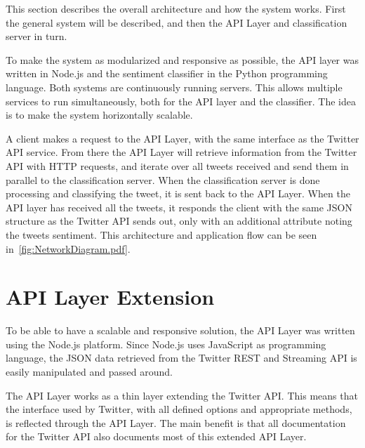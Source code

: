 This section describes the overall architecture and how the system works. First the general system will be described, and then the API Layer and classification server in turn.  

To make the system as modularized and responsive as possible, the API layer was written in Node.js and the sentiment classifier in the Python programming language. Both systems are continuously running servers. This allows multiple services to run simultaneously, both for the API layer and the classifier. The idea is to make the system horizontally scalable.


A client makes a request to the API Layer, with the same interface as the Twitter API service. From there the API Layer will retrieve information from the Twitter API with HTTP requests, and iterate over all tweets received and send them in parallel to the classification server. When the classification server is done processing and classifying the tweet, it is sent back to the API Layer. When the API layer has received all the tweets, it responds the client with the same JSON structure as the Twitter API sends out, only with an additional attribute noting the tweets sentiment. This architecture and application flow can be seen in~\autoref{fig:NetworkDiagram.pdf}. 

\section{API Layer Extension}



To be able to have a scalable and responsive solution, the API Layer was written using the Node.js platform. Since Node.js uses JavaScript as programming language, the JSON data retrieved from the Twitter REST and Streaming API is easily manipulated and passed around. 

The API Layer works as a thin layer extending the Twitter API. This means that the interface used by Twitter, with all defined options and appropriate methods, is reflected through the API Layer. The main benefit is that all documentation for the Twitter API also documents most of this extended API Layer.

